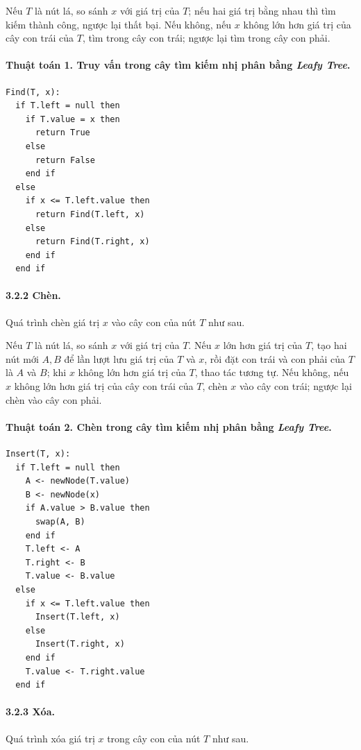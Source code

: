 \documentclass[11pt]{article}
\begin{document}
Nếu \(T\) là nút lá, so sánh \(x\) với giá trị của \(T\); nếu hai giá trị bằng
nhau thì tìm kiếm thành công, ngược lại thất bại. Nếu không, nếu \(x\) không
lớn hơn giá trị của cây con trái của \(T\), tìm trong cây con trái; ngược lại
tìm trong cây con phải.

\paragraph{Thuật toán 1. Truy vấn trong cây tìm kiếm nhị phân bằng \emph{Leafy Tree}.}
\begin{verbatim}
Find(T, x):
  if T.left = null then
    if T.value = x then
      return True
    else
      return False
    end if
  else
    if x <= T.left.value then
      return Find(T.left, x)
    else
      return Find(T.right, x)
    end if
  end if
\end{verbatim}

\paragraph{3.2.2 Chèn.}
Quá trình chèn giá trị \(x\) vào cây con của nút \(T\) như sau.

Nếu \(T\) là nút lá, so sánh \(x\) với giá trị của \(T\). Nếu \(x\) lớn hơn giá
trị của \(T\), tạo hai nút mới \(A,B\) để lần lượt lưu giá trị của \(T\) và
\(x\), rồi đặt con trái và con phải của \(T\) là \(A\) và \(B\); khi \(x\) không
lớn hơn giá trị của \(T\), thao tác tương tự. Nếu không, nếu \(x\) không lớn
hơn giá trị của cây con trái của \(T\), chèn \(x\) vào cây con trái; ngược lại
chèn vào cây con phải.

\paragraph{Thuật toán 2. Chèn trong cây tìm kiếm nhị phân bằng \emph{Leafy Tree}.}
\begin{verbatim}
Insert(T, x):
  if T.left = null then
    A <- newNode(T.value)
    B <- newNode(x)
    if A.value > B.value then
      swap(A, B)
    end if
    T.left <- A
    T.right <- B
    T.value <- B.value
  else
    if x <= T.left.value then
      Insert(T.left, x)
    else
      Insert(T.right, x)
    end if
    T.value <- T.right.value
  end if
\end{verbatim}

\paragraph{3.2.3 Xóa.}
Quá trình xóa giá trị \(x\) trong cây con của nút \(T\) như sau.
\end{document}
